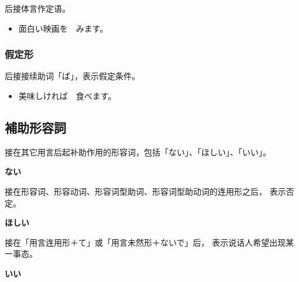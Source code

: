 后接体言作定语。
\begin{itemize}
  \item 面白い映画を　みます。
\end{itemize}


\subsubsection{假定形}%

后接接续助词「ば」，表示假定条件。
\begin{itemize}
  \item 美味しければ　食べます。
\end{itemize}


\subsection{補助形容詞}%

接在其它用言后起补助作用的形容词，包括「ない」、「ほしい」、「いい」。

{\bf
\noindent ない
}

接在形容词、形容动词、形容词型助词、形容词型助动词的连用形之后，
表示否定。

{\bf
\noindent ほしい
}

接在「用言连用形＋て」或「用言未然形＋ないで」后，
表示说话人希望出现某一事态。

{\bf
\noindent いい
}


